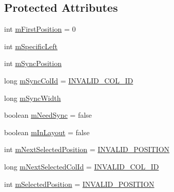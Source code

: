 \subsection*{Protected Attributes}
\begin{DoxyCompactItemize}
\item 
int \hyperlink{classit_1_1sephiroth_1_1android_1_1library_1_1widget_1_1_adapter_view_ad149972dc6a02ed28485f1f276595071}{m\+First\+Position} = 0
\item 
int \hyperlink{classit_1_1sephiroth_1_1android_1_1library_1_1widget_1_1_adapter_view_a8be6a59af0527974b9a0b7b23a031d89}{m\+Specific\+Left}
\item 
int \hyperlink{classit_1_1sephiroth_1_1android_1_1library_1_1widget_1_1_adapter_view_a3e6e08a38ce37453e939ee6c45f34a1e}{m\+Sync\+Position}
\item 
long \hyperlink{classit_1_1sephiroth_1_1android_1_1library_1_1widget_1_1_adapter_view_ad6ed8500ebbb7de0ac7a452385ffccb4}{m\+Sync\+Col\+Id} = \hyperlink{classit_1_1sephiroth_1_1android_1_1library_1_1widget_1_1_adapter_view_a4652ef84c3de9de7d3697a29e2bb96c6}{I\+N\+V\+A\+L\+I\+D\+\_\+\+C\+O\+L\+\_\+\+ID}
\item 
long \hyperlink{classit_1_1sephiroth_1_1android_1_1library_1_1widget_1_1_adapter_view_aee0a13efcf49cd9c6deed47527345eff}{m\+Sync\+Width}
\item 
boolean \hyperlink{classit_1_1sephiroth_1_1android_1_1library_1_1widget_1_1_adapter_view_aefa8f5425fc023e8afb83e826737437e}{m\+Need\+Sync} = false
\item 
boolean \hyperlink{classit_1_1sephiroth_1_1android_1_1library_1_1widget_1_1_adapter_view_aa094f9fc26901aa33c2b5d7026a216db}{m\+In\+Layout} = false
\item 
int \hyperlink{classit_1_1sephiroth_1_1android_1_1library_1_1widget_1_1_adapter_view_ab7b813f8435453a67af32da2dd84fe36}{m\+Next\+Selected\+Position} = \hyperlink{classit_1_1sephiroth_1_1android_1_1library_1_1widget_1_1_adapter_view_a2751b7d592638baeaf149f6da0d4e598}{I\+N\+V\+A\+L\+I\+D\+\_\+\+P\+O\+S\+I\+T\+I\+ON}
\item 
long \hyperlink{classit_1_1sephiroth_1_1android_1_1library_1_1widget_1_1_adapter_view_ae9d564b7b828fbd474ca54d60e39e5f8}{m\+Next\+Selected\+Col\+Id} = \hyperlink{classit_1_1sephiroth_1_1android_1_1library_1_1widget_1_1_adapter_view_a4652ef84c3de9de7d3697a29e2bb96c6}{I\+N\+V\+A\+L\+I\+D\+\_\+\+C\+O\+L\+\_\+\+ID}
\item 
int \hyperlink{classit_1_1sephiroth_1_1android_1_1library_1_1widget_1_1_adapter_view_ac61c50f327b3e8437b584c58688ab248}{m\+Selected\+Position} = \hyperlink{classit_1_1sephiroth_1_1android_1_1library_1_1widget_1_1_adapter_view_a2751b7d592638baeaf149f6da0d4e598}{I\+N\+V\+A\+L\+I\+D\+\_\+\+P\+O\+S\+I\+T\+I\+ON}

\end{DoxyCompactItemize}
